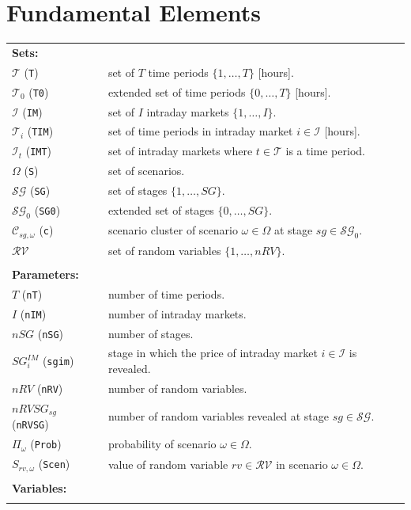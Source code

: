 \documentclass{article}
\begin{document}
\section{Fundamental Elements}
\label{SEC:FundamentalElements}

\begin{tabularx}{\textwidth}{l l}
    \textbf{Sets:} \\
    $\mathcal{T}$ (\verb|T|) & set of $T$ time periods $\{ 1, \dots, T \}$ [hours]. \\
	$\mathcal{T}_0$ (\verb|T0|) & extended set of time periods $\{ 0, \dots, T \}$ [hours]. \\     
	$\mathcal{I}$ (\verb|IM|) & set of $I$ intraday markets $\{1, \dots, I \}$. \\    
    $\mathcal{T}_i$ (\verb|TIM|) & set of time periods in intraday market $i \in \mathcal{I}$ [hours]. \\
	$\mathcal{I}_t$ (\verb|IMT|) & set of intraday markets where $t \in \mathcal{T}$ is a time period. \\    
	$\Omega$ (\verb|S|) & set of scenarios. \\
	$\mathcal{SG}$ (\verb|SG|) & set of stages $\{1, \dots, SG \}$. \\
	$\mathcal{SG}_0$ (\verb|SG0|) & extended set of stages $\{0, \dots, SG \}$. \\     
    $\mathcal{C}_{sg, \omega}$ (\verb|c|) & scenario cluster of scenario $\omega \in \Omega$ at stage $sg \in \mathcal{SG}_0$. \\
    $\mathcal{RV}$ & set of random variables $\{1, \dots, nRV \}$. \\
    \\
   
    
    \textbf{Parameters:} \\
	$T$ (\verb|nT|) & number of time periods. \\
	$I$ (\verb|nIM|) & number of intraday markets. \\
	$nSG$ (\verb|nSG|) & number of stages. \\
	$SG^{IM}_i$ (\verb|sgim|) & stage in which the price of intraday market $i \in \mathcal{I}$ is revealed. \\
	$nRV$ (\verb|nRV|) & number of random variables. \\
	$nRVSG_{sg}$ (\verb|nRVSG|) & number of random variables revealed at stage $sg \in \mathcal{SG}$. \\
	$\Pi_{\omega}$ (\verb|Prob|) & probability of scenario $\omega \in \Omega$. \\
	$S_{rv, \omega}$ (\verb|Scen|) & value of random variable $rv \in \mathcal{RV}$ in scenario $\omega \in \Omega$. \\    
    \\
       
    \textbf{Variables:} \\
	\\
\end{tabularx}
\end{document}
